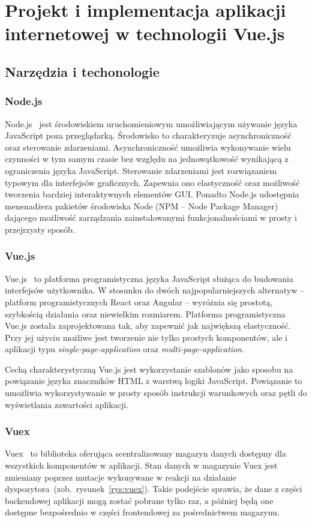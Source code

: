 
\chapter{Projekt i implementacja aplikacji internetowej w technologii Vue.js}
\section{Narzędzia i techonologie}
\subsection{Node.js}
Node.js~\cite{node} jest środowiskiem uruchomieniowym umożliwiającym używanie języka JavaScript poza przeglądarką. Środowisko to charakteryzuje asynchroniczność oraz sterowanie zdarzeniami. Asynchroniczność umożliwia wykonywanie wielu czynności w tym samym czasie bez względu na jednowątkowość wynikającą z ograniczenia języka JavaScript. Sterowanie zdarzeniami jest rozwiązaniem typowym dla interfejsów graficznych. Zapewnia ono elastyczność oraz możliwość tworzenia bardziej interaktywnych elementów GUI. Ponadto Node.js udostępnia menenadżera pakietów środowiska Node (NPM -- Node Package Manager) dającego możliwość zarządzania zainstalowanymi funkcjonalnościami w prosty i przejrzysty sposób.
\subsection{Vue.js}
Vue.js~\cite{vue} to platforma programistyczna języka JavaScript służąca do budowania interfejsów użytkownika. W stosunku do dwóch najpopularniejszych alternatyw -- platform programistycznych React oraz Angular -- wyróżnia się prostotą, szybkością działania oraz niewielkim rozmiarem. Platforma programistyczna Vue.js została zaprojektowana tak, aby zapewnić jak największą elastyczność. Przy jej użyciu możliwe jest tworzenie nie tylko prostych komponentów, ale i aplikacji typu \textit{single-page-application} oraz \textit{multi-page-application}. 

Cechą charakterystyczną Vue.js jest wykorzystanie szablonów jako sposobu na powiązanie języka znaczników HTML z warstwą logiki JavaScript. Powiązanie to umożliwia wykorzystywanie w prosty sposób instrukcji warunkowych oraz pętli do wyświetlania zawartości aplikacji.   

\subsection{Vuex}
Vuex~\cite{vuex} to biblioteka oferująca scentralizowany magazyn danych dostępny dla wszystkich komponentów w aplikacji. Stan danych w magazynie Vuex jest zmieniany poprzez mutacje wykonywane w reakcji na działanie dyspozytora~(zob.~rysunek~\ref{rys:vuex}). Takie podejście sprawia, że dane z części backendowej aplikacji mogą zostać pobrane tylko raz, a później będą one dostępne bezpośrednio w części frontendowej za pośrednictwem magazynu.

